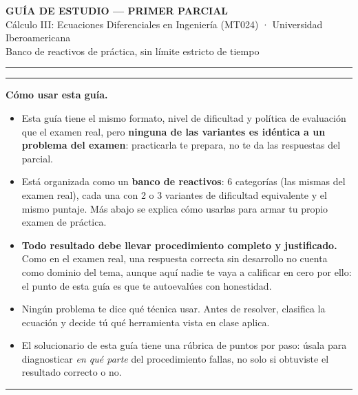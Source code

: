 \documentclass[11pt,letterpaper]{article}
\newenvironment{aviso}{%
  \par\vspace{2pt}\hrule\vspace{6pt}
}{%
  \par\vspace{6pt}\hrule\vspace{2pt}
}
\begin{document}
\begin{center}
{\Large\bfseries GUÍA DE ESTUDIO — PRIMER PARCIAL}\\[2pt]
{\small Cálculo III: Ecuaciones Diferenciales en Ingeniería (MT024) · Universidad Iberoamericana}\\[1pt]
{\small Banco de reactivos de práctica, sin límite estricto de tiempo}
\end{center}

\vspace{4pt}\hrule\vspace{10pt}

\begin{aviso}
\textbf{Cómo usar esta guía.}
\begin{itemize}[leftmargin=1.4em, itemsep=2pt, topsep=4pt]
  \item Esta guía tiene el mismo formato, nivel de dificultad y política de evaluación que el examen real, pero \textbf{ninguna de las variantes es idéntica a un problema del examen}: practicarla te prepara, no te da las respuestas del parcial.
  \item Está organizada como un \textbf{banco de reactivos}: 6 categorías (las mismas del examen real), cada una con 2 o 3 variantes de dificultad equivalente y el mismo puntaje. Más abajo se explica cómo usarlas para armar tu propio examen de práctica.
  \item \textbf{Todo resultado debe llevar procedimiento completo y justificado.} Como en el examen real, una respuesta correcta sin desarrollo no cuenta como dominio del tema, aunque aquí nadie te vaya a calificar en cero por ello: el punto de esta guía es que te autoevalúes con honestidad.
  \item Ningún problema te dice qué técnica usar. Antes de resolver, clasifica la ecuación y decide tú qué herramienta vista en clase aplica.
  \item El solucionario de esta guía tiene una rúbrica de puntos por paso: úsala para diagnosticar \emph{en qué parte} del procedimiento fallas, no solo si obtuviste el resultado correcto o no.
\end{itemize}
\end{aviso}
\end{document}
